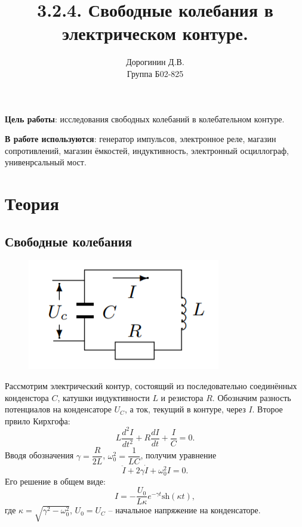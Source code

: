 \documentclass[a4paper,12pt]{article}
\author{Дорогинин Д.В.\\
Группа Б02-825}
\title{3.2.4. Свободные колебания в электрическом контуре.}
\date{}
\begin{document}
\maketitle
\textbf{Цель работы}: исследования свободных колебаний в колебательном контуре.


\textbf{В работе используются}: генератор импульсов, электронное реле, магазин сопротивлений, магазин ёмкостей, индуктивность, электронный осциллограф, унивенрсальный мост.
\section*{Теория}
\subsection*{Свободные колебания}
\begin{figure}
\includegraphics[scale=0.7]{2.png}
\end{figure}
Рассмотрим электрический контур, состоящий из последовательно соединённых конденстора $C$, катушки индуктивности $L$ и резистора $R$. Обозначим разность потенциалов на конденсаторе $U_C$, а ток, текущий в контуре, через $I$. Второе првило Кирхгофа:
\begin{equation}
L \dfrac{d^2I}{dt^2}+R\dfrac{dI}{dt}+\dfrac{I}{C}=0.
\end{equation}
Вводя обозначения $\gamma = \dfrac{R}{2L}$, $\omega_0^2=\dfrac{1}{LC}$, получим уравнение
\begin{equation}
\ddot{I}+2\gamma\dot{I}+\omega_0^2I=0.
\end{equation}
Его решение в общем виде:
\begin{equation}
I = -\dfrac{U_0}{L\kappa}e^{-\gamma t}\text{sh}(\kappa t), 
\end{equation}
где $\kappa = \sqrt{\gamma^2 - \omega_0^2}$, $U_0 = U_C$ -- начальное напряжение на конденсаторе.
\end{document}
